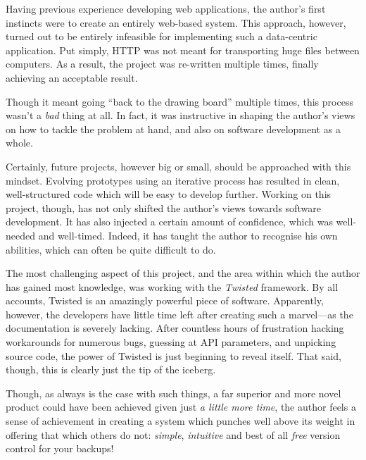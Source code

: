Having previous experience developing web applications, the author's first
instincts were to create an entirely web-based system. This approach, however,
turned out to be entirely infeasible for implementing such a data-centric
application. Put simply, HTTP was not meant for transporting huge files between
computers. As a result, the project was re-written multiple times, finally
achieving an acceptable result.

Though it meant going ``back to the drawing board'' multiple times, this
process wasn't a \emph{bad} thing at all. In fact, it was instructive in
shaping the author's views on how to tackle the problem at hand, and also on
software development as a whole.

Certainly, future projects, however big or small, should be approached with
this mindset. Evolving prototypes using an iterative process has resulted in
clean, well-structured code which will be easy to develop further. Working on
this project, though, has not only shifted the author's views towards software
development. It has also injected a certain amount of confidence, which was
well-needed and well-timed. Indeed, it has taught the author to recognise his
own abilities, which can often be quite difficult to do.

The most challenging aspect of this project, and the area within which the
author has gained most knowledge, was working with the \emph{Twisted}
framework. By all accounts, Twisted is an amazingly powerful piece of software.
Apparently, however, the developers have little time left after creating such
a marvel---as the documentation is severely lacking. After countless hours of
frustration hacking workarounds for numerous bugs, guessing at API parameters,
and unpicking source code, the power of Twisted is just beginning to reveal
itself. That said, though, this is clearly just the tip of the iceberg.

Though, as always is the case with such things, a far superior and more novel
product could have been achieved given just \emph{a little more time}, the
author feels a sense of achievement in creating a system which punches well
above its weight in offering that which others do not: \emph{simple},
\emph{intuitive} and best of all \emph{free} version control for your backups!

